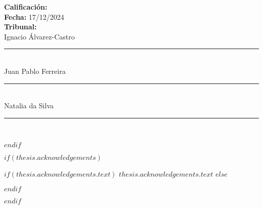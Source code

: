     \begin{flushleft}
    \textbf{Calificación:} \\
    \vspace{0.8cm}
    \textbf{Fecha:} 17/12/2024\\
    \vspace{1cm}
    \textbf{Tribunal:}\\
    \vspace{0.8cm}
    Ignacio Álvarez-Castro {\rule{0.5\textwidth}{.4pt}}\\
    \vspace{0.8cm}
    Juan Pablo Ferreira{\rule{0.5\textwidth}{.4pt}}\\
    \vspace{0.8cm}
    Natalia da Silva {\rule{0.5\textwidth}{.4pt}}\\

    \end{flushleft}

$endif$

$if(thesis.acknowledgements)$

\begin{acknowledgements}
\addchaptertocentry{\acknowledgementname} %
$if(thesis.acknowledgements.text)$
$thesis.acknowledgements.text$
$else$

$endif$
\end{acknowledgements}

$endif$


\begingroup
\hypersetup{linkcolor=$if(toclinkcolor)$$toclinkcolor$$else$black$endif$}




\renewcommand{\chaptername}{Capítulo}
\renewcommand{\tablename}{Tabla}
\renewcommand{\contentsname}{Índice}
\renewcommand{\listfigurename}{Lista de Figuras}
\renewcommand{\listtablename}{Lista de Tablas}



\tableofcontents %

\listoffigures %

